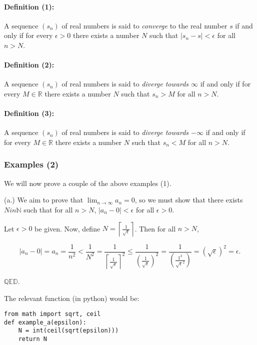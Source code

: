 \documentclass[]{article}
\begin{document}
\paragraph{Definition (1):}

A sequence $(s_n)$ of real numbers is said to \emph{converge} to the
real number $s$ if and only if for every $\epsilon > 0$ there exists a
number $N$ such that $\vert s_n - s\vert  < \epsilon$ for all $n > N$.

\paragraph{Definition (2):}

A sequence $(s_n)$ of real numbers is said to \emph{diverge towards
$\infty$} if and only if for every $M \in \mathbb{R}$ there exists a
number $N$ such that $s_n > M$ for all $n > N$.

\paragraph{Definition (3):}

A sequence $(s_n)$ of real numbers is said to \emph{diverge towards
$-\infty$} if and only if for every $M \in \mathbb{R}$ there exists a
number $N$ such that $s_n < M$ for all $n > N$.

\subsubsection{Examples (2)}

We will now prove a couple of the above examples (1).

(a.) We aim to prove that $\lim_{n \to \infty} a_n = 0$, so we must show
that there exists $N in \mathbb{N}$ such that for all $n >N$,
$\vert a_n - 0\vert  < \epsilon$ for all $\epsilon > 0$.

Let $\epsilon > 0$ be given. Now, define
$N = \left \lceil \frac{1}{\sqrt{\epsilon}} \right \rceil $. Then for
all $n > N$,

\[\vert a_n - 0\vert  = a_n = \frac{1}{n^2} < \frac{1}{N^2} = \frac{1}{\left \lceil \frac{1}{\sqrt{\epsilon}} \right \rceil^2} \le \frac{1}{\left (\frac{1}{\sqrt{\epsilon}} \right )^2} = \frac{1}{\left (\frac{1^2}{\sqrt{\epsilon}^2} \right )} = \left( \sqrt{\epsilon} \right)^2 = \epsilon.\]

$\mathbb{QED}$.

The relevant function (in python) would be:

\begin{verbatim}
from math import sqrt, ceil
def example_a(epsilon):
    N = int(ceil(sqrt(epsilon)))
    return N
\end{verbatim}
\end{document}
